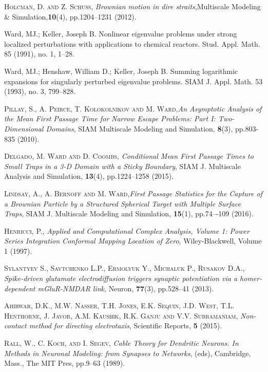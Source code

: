 \documentclass[12pt]{article}
\newcommand{\SC}{\textsc}
\begin{document}
{\begin{thebibliography}{99}
\SC{Holcman, D. and Z. Schuss}, {\it Brownian motion in dire straits},{Multiscale Modeling \& Simulation},\textbf{10}(4), pp.1204--1231 (2012).


 Ward, MJ.; Keller, Joseph B. Nonlinear eigenvalue problems under strong localized perturbations with applications to chemical reactors. Stud. Appl. Math. 85 (1991), no. 1, 1–28.

 Ward, MJ.; Henshaw, William D.; Keller, Joseph B. Summing logarithmic expansions for singularly perturbed eigenvalue problems. SIAM J. Appl. Math. 53 (1993), no. 3, 799–828.

\SC{Pillay, S., A. Peirce, T. Kolokolnikov and  M. Ward},{\it An Asymptotic Analysis of the Mean First Passage Time for Narrow Escape Problems: Part I: Two-Dimensional Domains}, {SIAM Multiscale Modeling and Simulation,} \textbf{8}(3), pp.803-835 (2010).

\SC{Delgado, M. Ward and D. Coombs}, {\it Conditional Mean First Passage Times to Small Traps in a 3-D Domain with a Sticky
	Boundary}, {SIAM J. Multiscale Analysis and Simulation,} \textbf{13}(4), pp.1224--1258 (2015).

\SC{Lindsay, A., A. Bernoff and M. Ward},{\it First Passage Statistics for the Capture of a Brownian Particle by a Structured Spherical Target with Multiple Surface Traps}, {SIAM J. Multiscale Modeling and Simulation}, {\bf15}(1), pp.74–-109 (2016).

\SC{Henricci, P.}, {\it Applied and Computational Complex Analysis, Volume 1: Power Series Integration Conformal Mapping Location of Zero}, {Wiley-Blackwell}, Volume 1 (1997).

 \SC{Sylantyev S., Savtchenko L.P., Ermolyuk Y., Michaluk P., Rusakov D.A.}, {\it Spike-driven glutamate electrodiffusion triggers synaptic potentiation via a homer-dependent mGluR-NMDAR link},  {Neuron}, {\bf77}(3), pp.528--41 (2013).

\SC{Ahirwar,  D.K., M.W. Nasser, T.H. Jones, E.K. Sequin, J.D. West, T.L. Henthorne, J. Javor, A.M. Kaushik, R.K. Ganju and V.V. Subramaniam}, {\it Non-contact method for directing electrotaxis}, {Scientific Reports}, {\bf5} (2015).

\SC{Rall, W., C. Koch, and I. Segev,} {\it Cable Theory for Dendritic Neurons. In Methods in Neuronal Modeling: from Synapses to Networks},  { (eds), Cambridge, Mass., The MIT Pres}, pp.9--63 (1989).
	

\end{thebibliography}}
\end{document}
